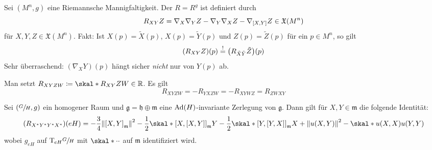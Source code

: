 \begin{erinnerung}
	Sei $(M^n,g)$ eine Riemannsche Mannigfaltigkeit.
	Der  $R=R^g$ ist definiert durch
	\[
		R_{XY}Z = \nabla_X \nabla_Y Z - \nabla_Y \nabla_X Z - \nabla_{\benbrace*{X,Y}} Z \in \mathfrak{X}(M^n)
	\] 
	für $X,Y,Z \in \mathfrak{X}(M^n)$.
	Fakt: Ist $X(p) = \tilde{X}(p)$, $X(p) = \tilde{Y}(p)$ und $Z(p) = \tilde{Z}(p)$ für ein $p \in M^n$, so gilt
	\[
		(R_{XY}Z)(p) \stackrel{!}{=} \enbrace*{R_{\tilde{X} \tilde{Y}} \tilde{Z}}(p)
	\]
	Sehr überraschend: $(\nabla_X Y)(p)$ hängt sicher \emph{nicht} nur von $Y(p)$ ab.
\end{erinnerung}

Man setzt $R_{XYZW} \coloneqq \skal*{R_{XY} Z}{W} \in \mathbb{R}$. Es gilt
\[
	R_{XYZW} = - R_{YXZW} = -R_{XYWZ} = R_{ZWXY}
\]

\begin{satz}[label=satz:324]
	Sei $\enbrace*{\sfrac{G}{H},g}$ ein homogener Raum und $\mathfrak{g} = \mathfrak{h} \oplus \mathfrak{m}$ eine $\Ad(H)$-invariante Zerlegung von $\mathfrak{g}$.
	Dann gilt für $X,Y \in \mathfrak{m}$ die folgende Identität:
	\[
		\enbrace*{R_{X^*Y^*Y^*X^*}}(eH) = -\frac{3}{4} \norm*{\benbrace*{X,Y}_{\mathfrak{m}}}^2 - \frac{1}{2} \skal*{\benbrace*{X, \benbrace*{X,Y}}_{\mathfrak{m}}}{Y} - \frac{1}{2} \skal*{\benbrace*{Y, \benbrace*{Y,X}}_{\mathfrak{m}}}{X} + \norm*{u(X,Y)}^2 - \skal*{u(X,X)}{u(Y,Y)}
	\]
	wobei $g_{eH}$ auf $\Tmap_{eH} \sfrac{G}{H}$ mit $\skal*{\cdot}{\cdot }$ auf $\mathfrak{m}$ identifiziert wird.
\end{satz}
